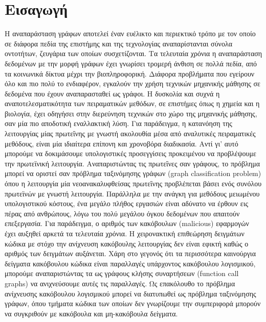 \mainmatter
\chapter{Εισαγωγή}
\label{chap1}



Η αναπαράσταση γράφων αποτελεί έναν ευέλικτο και περιεκτικό τρόπο με τον οποίο σε διάφορα πεδία της επιστήμης και της τεχνολογίας αναπαρίστανται σύνολα οντοτήτων, ζευγάρια των οποίων συσχετίζονται.
Τα τελευταία χρόνια η αναπαράσταση δεδομένων με την μορφή γράφων έχει γνωρίσει τρομερή άνθιση σε πολλά πεδία, από τα κοινωνικά δίκτυα μέχρι την βιοπληροφορική.
Διάφορα προβλήματα που εγείρουν όλο και πιο πολύ το ενδιαφέρον, εγκαλούν την χρήση τεχνικών μηχανικής μάθησης σε δεδομένα που έχουν αναπαρασταθεί ως γράφοι.
Η δυσκολία και συχνά η αναποτελεσματικότητα των πειραματικών μεθόδων, σε επιστήμες όπως η χημεία και η βιολογία, έχει οδηγήσει στην διερεύνηση τεχνικών στο χώρο της μηχανικής μάθησης, σαν μία πιο αποδοτική εναλλακτική λύση. Για παράδειγμα, η κατανόηση της λειτουργίας μίας πρωτεΐνης με γνωστή ακολουθία μέσα από αναλυτικές πειραματικές μεθόδους, είναι μία ιδιαίτερα επίπονη και χρονοβόρα διαδικασία.
Αντί γι' αυτό μπορούμε να δοκιμάσουμε υπολογιστικές προσεγγίσεις προκειμένου να προβλέψουμε την πρωτεϊνική λειτουργία.
Αναπαριστώντας τις πρωτεΐνες σαν γράφους, το πρόβλημα μπορεί να οριστεί σαν πρόβλημα ταξινόμησης γράφων (graph classification problem) όπου η λειτουργία μία νεοανακαλυφθείσας πρωτεΐνης προβλέπεται βάσει ενός συνόλου πρωτεϊνών με γνωστή λειτουργία. 
Παράλληλα με την ανάγκη για μεθόδους μειωμένου υπολογιστικού κόστους, ένα μεγάλο πλήθος εργασιών είναι αδύνατο να έρθουν εις πέρας από ανθρώπους, λόγω του πολύ μεγάλου όγκου δεδομένων που απαιτούν επεξεργασία.
Για παράδειγμα, ο αριθμός των κακόβουλων (malicious) εφαρμογών έχει αυξηθεί αρκετά τα τελευταία χρόνια.
Η χειρονακτική επιθεώρηση δειγμάτων κώδικα με στόχο την ανίχνευση κακόβουλης λειτουργίας δεν είναι εφικτή καθώς ο αριθμός των δειγμάτων αυξάνεται. 
Χάρη στο γεγονός ότι τα περισσότερα καινούργια δείγματα κακόβουλου κώδικα είναι παραλλαγές υπάρχοντος κακόβουλου λογισμικού, μπορούμε αναπαριστώντας τα ως γράφους κλήσης συναρτήσεων (function call graphs) να ανιχνεύσουμε αυτές τις παραλλαγές.
Ως επακόλουθο το πρόβλημα ανίχνευσης κακόβουλου λογισμικού μπορεί να διατυπωθεί ως πρόβλημα ταξινόμησης γράφων, όπου τμήματα κώδικα των οποίων δεν γνωρίζουμε την συμπεριφορά μπορούν να συγκριθούν με κακόβουλα και μη-κακόβουλα δείγματα. 
